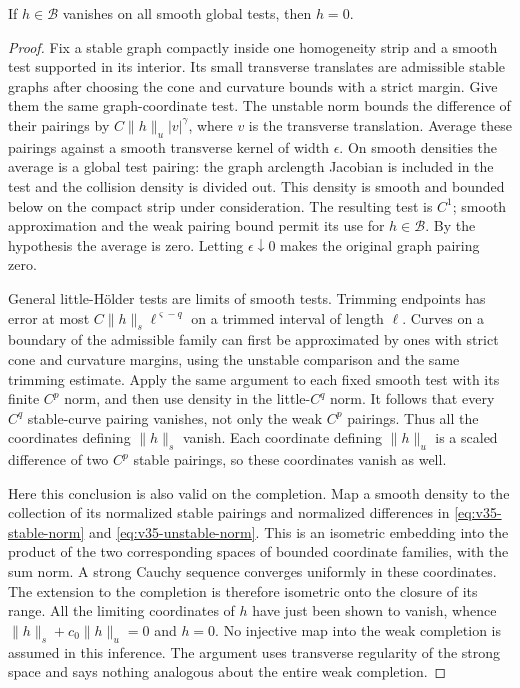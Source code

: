 \begin{lemma}
\label{lem:v35-faithful-strong}
If $h\in\mathcal B$ vanishes on all smooth global tests, then $h=0$.
\end{lemma}
\begin{proof}
Fix a stable graph compactly inside one homogeneity strip and a smooth
test supported in its interior. Its small transverse translates are
admissible stable graphs after choosing the cone and curvature bounds
with a strict margin. Give them the same graph-coordinate test. The
unstable norm bounds the difference of their pairings by
$C\|h\|_u|v|^\gamma$, where $v$ is the transverse translation.
Average these pairings against a smooth transverse kernel of width
$\epsilon$. On smooth densities the average is a global test pairing:
the graph arclength Jacobian is included in the test and the collision
density is divided out. This density is smooth and bounded below on
the compact strip under consideration. The resulting test is $C^1$;
smooth approximation and the weak pairing bound permit its use for
$h\in\mathcal B$. By the hypothesis the average is zero. Letting
$\epsilon\downarrow0$ makes the original graph pairing zero.

General little-H\"older tests are limits of smooth tests. Trimming
endpoints has error at most $C\|h\|_s\ell^{\varsigma-q}$ on a trimmed
interval of length $\ell$. Curves on a boundary of the admissible
family can first be approximated by ones with strict cone and curvature
margins, using the unstable comparison and the same trimming estimate.
Apply the same argument to each fixed smooth test with its finite
$C^p$ norm, and then use density in the little-$C^q$ norm. It follows
that every $C^q$ stable-curve pairing vanishes, not only the weak
$C^p$ pairings. Thus all the coordinates defining $\|h\|_s$ vanish.
Each coordinate defining $\|h\|_u$ is a scaled difference of two
$C^p$ stable pairings, so these coordinates vanish as well.

Here this conclusion is also valid on the completion. Map a smooth
density to the collection of its normalized stable pairings and
normalized differences in \eqref{eq:v35-stable-norm} and
\eqref{eq:v35-unstable-norm}. This is an isometric embedding into the
product of the two corresponding spaces of bounded coordinate
families, with the sum norm. A strong Cauchy sequence converges
uniformly in these coordinates. The extension to the completion is
therefore isometric onto the closure of its range. All the limiting
coordinates of $h$ have just been shown to vanish, whence
$\|h\|_s+c_0\|h\|_u=0$ and $h=0$. No injective map into the weak
completion is assumed in this inference. The argument uses transverse
regularity of the strong space and says nothing analogous about the
entire weak completion.
\end{proof}


